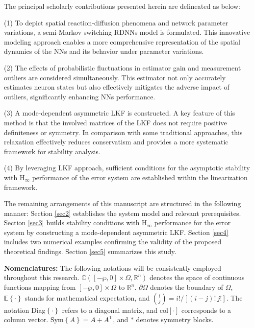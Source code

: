 \documentclass[preprint,review,fleqn,sort&compress,3p]{elsarticle}
\theoremstyle{definition}%
\begin{document}
	The principal scholarly contributions presented herein are delineated as below:
	
	(1) To depict spatial reaction-diffusion phenomena and network parameter variations,  a semi-Markov switching RDNNs model is formulated. This innovative modeling approach enables a more comprehensive representation of the spatial dynamics of the NNs and its behavior under parameter variations.
	
	(2) The effects of probabilistic fluctuations in estimator gain and measurement outliers are considered simultaneously. This estimator not only accurately estimates neuron states but also effectively mitigates the adverse impact of outliers, significantly enhancing NNs performance.
	
	(3) A mode-dependent asymmetric LKF is constructed. A key feature of this method is that the involved matrices of the LKF does not require positive definiteness or symmetry.  In comparison with some traditional approaches, this relaxation effectively reduces conservatism and provides a more systematic framework for stability analysis.
	
	(4) By leveraging LKF approach, sufficient conditions for the asymptotic stability with $\text{H}_\infty$ performance of the error system  are established within the linearization framework.
	
	The remaining arrangements of this manuscript are structured in the following manner: Section \ref{sec2} establishes the system model and relevant prerequisites. Section \ref{sec3} builds stability conditions with $\text{H}_\infty$ performance for the error system by constructing a mode-dependent asymmetric LKF. Section \ref{sec4}  includes two numerical examples confirming the validity of the proposed theoretical findings. Section \ref{sec5} summarizes this study.
	
	\textbf{Nomenclatures:} The following notations will be consistently employed throughout this research. $\mathbb{C}([-\wp, 0] \times \Omega, \mathbb{R}^n)$  denotes the space of continuous functions mapping from $[-\wp, 0] \times \Omega$ to $\mathbb{R}^n$. $\partial \Omega$ denotes the boundary of $ \Omega $, $\mathbb{E}\left\{ \cdot \right\}$ stands for mathematical expectation, and $\binom{i}{j} = i! / \left[ (i - j)! \, j! \right]$. The notation Diag$\left\{ \cdot \right\}$ refers to a diagonal matrix, and col$\left[ \cdot \right]$ corresponds to a column vector. Sym$\left\{A\right\} =A+A^\text{T}$, and $*$ denotes symmetry blocks. 
\end{document}
